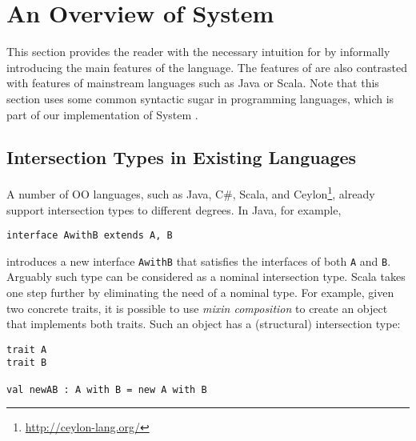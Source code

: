 \section{An Overview of System \name}


This section provides the reader with the necessary intuition for
\name by informally introducing the main features of the language.
The features of \name are also contrasted with features of mainstream
languages such as Java or Scala. Note that this section uses some 
common syntactic sugar in programming languages, which is 
part of our implementation of System \name.
 

\subsection{Intersection Types in Existing Languages}

A number of OO languages, such as Java, C\#, Scala, and
Ceylon\footnote{\url{http://ceylon-lang.org/}}, already support intersection
types to different degrees. In Java, for example,

\begin{lstlisting}
interface AwithB extends A, B 
\end{lstlisting}

\noindent introduces a new interface \lstinline{AwithB} that satisfies the interfaces of
both \lstinline{A} and \lstinline{B}. Arguably such type can be considered as a nominal
intersection type. Scala takes one step further by eliminating the
need of a nominal type. For example, given two concrete traits, it is possible to
use \emph{mixin composition} to create an object that implements both 
traits. Such an object has a (structural) intersection type:

\begin{lstlisting}
trait A
trait B

val newAB : A with B = new A with B
\end{lstlisting}

